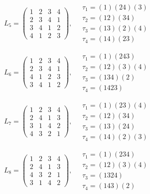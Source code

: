$L_{5} = \begin{pmatrix} 1 & 2 & 3 & 4 \\ 2 & 3 & 4 & 1 \\ 3 & 4 & 1 & 2 \\ 4 & 1 & 2 & 3 \end{pmatrix}, \quad \begin{matrix} \tau_{1} = (1)(2 4)(3) \\ \tau_{2} = (1 2)(3 4) \\ \tau_{3} = (1 3)(2)(4) \\ \tau_{4} = (1 4)(2 3) \end{matrix}$

$L_{6} = \begin{pmatrix} 1 & 2 & 3 & 4 \\ 2 & 3 & 4 & 1 \\ 4 & 1 & 2 & 3 \\ 3 & 4 & 1 & 2 \end{pmatrix}, \quad \begin{matrix} \tau_{1} = (1)(2 4 3) \\ \tau_{2} = (1 2)(3)(4) \\ \tau_{3} = (1 3 4)(2) \\ \tau_{4} = (1 4 2 3) \end{matrix}$

$L_{7} = \begin{pmatrix} 1 & 2 & 3 & 4 \\ 2 & 4 & 1 & 3 \\ 3 & 1 & 4 & 2 \\ 4 & 3 & 2 & 1 \end{pmatrix}, \quad \begin{matrix} \tau_{1} = (1)(2 3)(4) \\ \tau_{2} = (1 2)(3 4) \\ \tau_{3} = (1 3)(2 4) \\ \tau_{4} = (1 4)(2)(3) \end{matrix}$

$L_{8} = \begin{pmatrix} 1 & 2 & 3 & 4 \\ 2 & 4 & 1 & 3 \\ 4 & 3 & 2 & 1 \\ 3 & 1 & 4 & 2 \end{pmatrix}, \quad \begin{matrix} \tau_{1} = (1)(2 3 4) \\ \tau_{2} = (1 2)(3)(4) \\ \tau_{3} = (1 3 2 4) \\ \tau_{4} = (1 4 3)(2) \end{matrix}$

